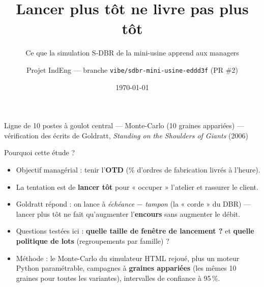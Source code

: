 \documentclass[10pt,aspectratio=169]{beamer}
\title[Lancer plus tôt ne livre pas plus tôt]{Lancer plus tôt ne livre pas plus tôt}
\subtitle{Ce que la simulation S-DBR de la mini-usine apprend aux managers}
\author{Projet IndEng --- branche \texttt{vibe/sdbr-mini-usine-eddd3f} (PR \#2)}
\date{\today}
\begin{document}
\begin{frame}
\titlepage
\begin{center}
\small
Ligne de 10 postes à goulot central --- Monte-Carlo (10 graines appariées) ---\\
vérification des écrits de Goldratt, \emph{Standing on the Shoulders of Giants} (2006)
\end{center}
\end{frame}

\begin{frame}{Pourquoi cette étude ?}
\begin{itemize}
  \item Objectif managérial : tenir l'\textbf{OTD} (\% d'ordres de fabrication livrés à l'heure).
  \item La tentation est de \textbf{lancer tôt} pour « occuper » l'atelier et rassurer le client.
  \item Goldratt répond : on lance à \emph{échéance $-$ tampon} (la « corde » du DBR) --- lancer plus tôt
        ne fait qu'augmenter l'\textbf{encours} sans augmenter le débit.
  \item Questions testées ici : \textbf{quelle taille de fenêtre de lancement ?} et
        \textbf{quelle politique de lots} (regroupements par famille) ?
  \item Méthode : le Monte-Carlo du simulateur HTML rejoué, plus un moteur Python paramétrable,
        campagnes à \textbf{graines appariées} (les mêmes 10 graines pour toutes les variantes),
        intervalles de confiance à 95\,\%.
\end{itemize}
\end{frame}
\end{document}
